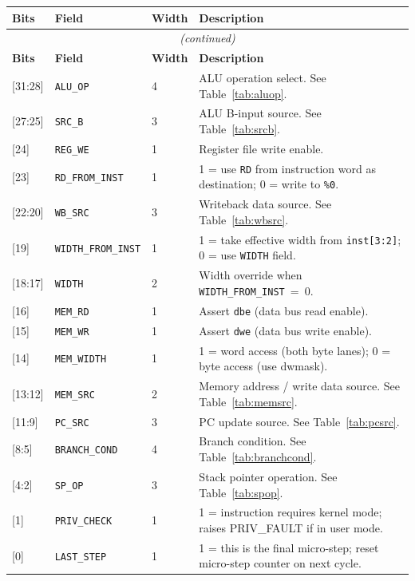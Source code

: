 \documentclass[a4paper,12pt]{report}
\newcommand{\field}[1]{\texttt{\small #1}}
\newcommand{\reg}[1]{\texttt{\%#1}}
\newcommand{\signal}[1]{\texttt{#1}}
\begin{document}
\begin{longtable}{lllX}
\toprule
\textbf{Bits} & \textbf{Field} & \textbf{Width} & \textbf{Description} \\
\midrule
\endfirsthead
\multicolumn{4}{c}{\textit{(continued)}} \\
\toprule
\textbf{Bits} & \textbf{Field} & \textbf{Width} & \textbf{Description} \\
\midrule
\endhead
\bottomrule
\endlastfoot

{[31:28]} & \field{ALU\_OP}           & 4 & ALU operation select. See Table~\ref{tab:aluop}. \\
{[27:25]} & \field{SRC\_B}            & 3 & ALU B-input source. See Table~\ref{tab:srcb}. \\
{[24]}    & \field{REG\_WE}           & 1 & Register file write enable. \\
{[23]}    & \field{RD\_FROM\_INST}    & 1 & 1 = use \field{RD} from instruction word as destination; 0 = write to \reg{0}. \\
{[22:20]} & \field{WB\_SRC}           & 3 & Writeback data source. See Table~\ref{tab:wbsrc}. \\
{[19]}    & \field{WIDTH\_FROM\_INST} & 1 & 1 = take effective width from \field{inst[3:2]}; 0 = use \field{WIDTH} field. \\
{[18:17]} & \field{WIDTH}             & 2 & Width override when \field{WIDTH\_FROM\_INST}~=~0. \\
{[16]}    & \field{MEM\_RD}           & 1 & Assert \signal{dbe} (data bus read enable). \\
{[15]}    & \field{MEM\_WR}           & 1 & Assert \signal{dwe} (data bus write enable). \\
{[14]}    & \field{MEM\_WIDTH}        & 1 & 1 = word access (both byte lanes); 0 = byte access (use dwmask). \\
{[13:12]} & \field{MEM\_SRC}          & 2 & Memory address / write data source. See Table~\ref{tab:memsrc}. \\
{[11:9]}  & \field{PC\_SRC}           & 3 & PC update source. See Table~\ref{tab:pcsrc}. \\
{[8:5]}   & \field{BRANCH\_COND}      & 4 & Branch condition. See Table~\ref{tab:branchcond}. \\
{[4:2]}   & \field{SP\_OP}            & 3 & Stack pointer operation. See Table~\ref{tab:spop}. \\
{[1]}     & \field{PRIV\_CHECK}       & 1 & 1 = instruction requires kernel mode; raises PRIV\_FAULT if in user mode. \\
{[0]}     & \field{LAST\_STEP}        & 1 & 1 = this is the final micro-step; reset micro-step counter on next cycle. \\
\end{longtable}
\end{document}
